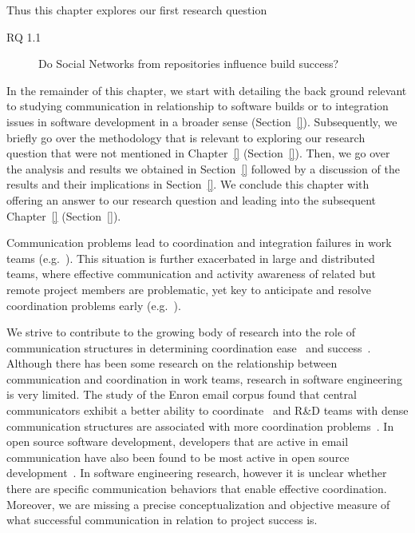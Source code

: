 \label{chap:soc-net}


Thus this chapter explores our first research question
\begin{description}
\item[RQ 1.1] Do Social Networks from repositories influence build success?
\end{description}

In the remainder of this chapter, we start with detailing the back ground relevant to studying communication in relationship to software builds or to integration issues in software development in a broader sense (Section~\ref{}).
Subsequently, we briefly go over the methodology that is relevant to exploring our research question that were not mentioned in Chapter~\ref{} (Section~\ref{}).
Then, we go over the analysis and results we obtained in Section~\ref{} followed by a discussion of the results and their implications in Section~\ref{}.
We conclude this chapter with offering an answer to our research question and leading into the subsequent Chapter~\ref{} (Section~\ref{}).



\pagebreak

Communication problems lead to coordination and integration failures in work
teams (e.g.~\cite{Grinter:1999geography,Herbsleb:1999ew,souza:cscw:2004}). This
situation is further exacerbated in large and distributed teams, where effective
communication and activity awareness of related but remote project members are
problematic, yet key to anticipate and resolve coordination problems early
(e.g.~\cite{Grinter:1999geography,Herbsleb:1999ew}).

We strive to contribute to the growing body of research into the role of
communication structures in determining coordination ease~\cite{hinds:cscw:2006} and
success~\cite{hossain:cscw:2006}. Although there has been some research on the
relationship between communication and coordination in work teams, research in
software engineering is very limited. The study of the Enron email corpus found
that central communicators exhibit a better ability to
coordinate~\cite{hossain:cscw:2006} and R\&D teams with dense communication
structures are associated with more coordination problems~\cite{hinds:cscw:2006}. In
open source software development, developers that are active in email
communication have also been found to be most active in open source
development~\cite{bird:msr:2006}. In software engineering research, however it is
unclear whether there are specific communication behaviors that enable effective
coordination. Moreover, we are missing a precise conceptualization and objective
measure of what successful communication in relation to project success is.

